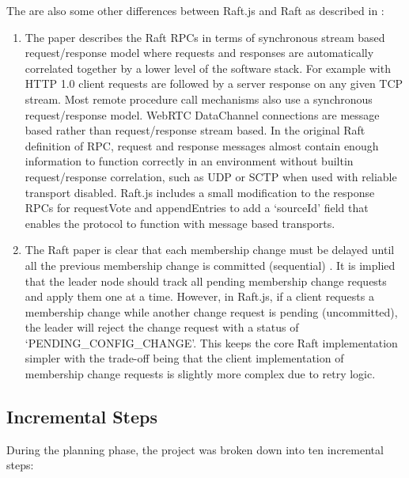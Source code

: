 \documentclass[conference,compsoc]{./IEEEtran/IEEEtran}
\begin{document}
The are also some other differences between Raft.js and Raft as
described in \cite[Consensus:~Diego]{raft_thesis:ongaro14}:

\begin{enumerate}
\item The paper describes the Raft RPCs in terms of synchronous stream
    based request/response model where requests and responses are
    automatically correlated together by a lower level of the software
    stack. For example with HTTP 1.0 \cite{http:rfc1945} client
    requests are followed by a server response on any given TCP
    stream. Most remote procedure call mechanisms also use
    a synchronous request/response model. %
    WebRTC DataChannel connections are message based rather than
    request/response stream based. %
    In the original Raft definition of RPC, request and response messages
    almost contain enough information to function correctly in an
    environment without builtin request/response correlation, such as
    UDP or SCTP when used with reliable transport disabled. %
    Raft.js includes a small modification to the response RPCs for
    requestVote and appendEntries to add a `sourceId' field that
    enables the protocol to function with message based transports.
\item The Raft paper is clear that each membership change must be
    delayed until all the previous membership change is committed
    (sequential) \cite[Section~4.1]{raft_thesis:ongaro14}. It is
    implied that the leader node should track all pending membership
    change requests and apply them one at a time.  However, in
    Raft.js, if a client requests a membership change while another
    change request is pending (uncommitted), the leader will reject
    the change request with a status of `PENDING\_CONFIG\_CHANGE'.
    This keeps the core Raft implementation simpler with the trade-off
    being that the client implementation of membership change requests
    is slightly more complex due to retry logic.
\end{enumerate}

\ifdefined\OPTIONAL

\subsection{Incremental Steps}

During the planning phase, the project was broken down into ten incremental steps:
\end{document}
